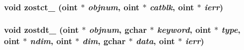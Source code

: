 \subsubsection{\setlength{\rightskip}{0pt plus 5cm}void zostct\_\- ({\bf oint} $\ast$ {\em objnum}, {\bf oint} $\ast$ {\em catblk}, {\bf oint} $\ast$ {\em ierr})}\label{ObitAIPSObject_8c_a19}


\subsubsection{\setlength{\rightskip}{0pt plus 5cm}void zostdt\_\- ({\bf oint} $\ast$ {\em objnum}, gchar $\ast$ {\em keyword}, {\bf oint} $\ast$ {\em type}, {\bf oint} $\ast$ {\em ndim}, {\bf oint} $\ast$ {\em dim}, gchar $\ast$ {\em data}, {\bf oint} $\ast$ {\em ierr})}\label{ObitAIPSObject_8c_a17}


